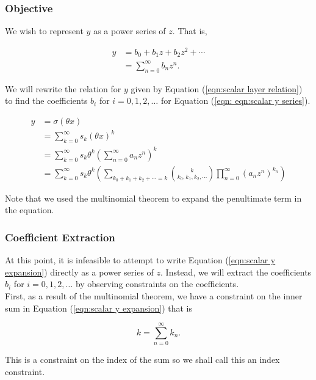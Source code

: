 \subsubsection{Objective}
We wish to represent $y$ as a power series of $z$. That is,

\begin{align}
    y
    &= b_0 + b_1 z + b_2 z^2 + \cdots \nonumber \\
	&= \sum_{n=0}^{\infty} b_{n} z^{n}.
	\label{eqn:scalar y series}
\end{align}

We will rewrite the relation for $y$ given by Equation (\ref{eqn:scalar layer relation}) to find the coefficients $b_i$ for $i = 0, 1, 2, \ldots$ for Equation (\ref{eqn: eqn:scalar y series}).

\begin{align}
    y
    &= \sigma(\theta x) \nonumber \\
    &= \sum_{k=0}^{\infty} s_k (\theta x)^k \nonumber \\
    &= \sum_{k=0}^{\infty} s_k \theta^k \left(\sum_{n=0}^{\infty} a_{n} z^{n}\right)^{k} \nonumber \\
	&= \sum_{k=0}^{\infty} s_k \theta^k \left(\sum_{k_0 + k_1 + k_2 + \cdots = k} \binom{k}{k_0, k_1, k_2, \cdots} \prod_{n=0}^{\infty} (a_n z^{n})^{k_n} \right)
	\label{eqn:scalar y expansion}
\end{align}

Note that we used the multinomial theorem to expand the penultimate term in the equation.

\subsubsection{Coefficient Extraction}

At this point, it is infeasible to attempt to write Equation (\ref{eqn:scalar y expansion}) directly as a power series of $z$. Instead, we will extract the coefficients $b_i$ for $i = 0, 1, 2, \ldots$ by observing constraints on the coefficients.\\

First, as a result of the multinomial theorem, we have a constraint on the inner sum in Equation (\ref{eqn:scalar y expansion}) that is

\begin{equation}
	k = \sum_{n=0}^{\infty} k_n.
	\label{eqn:scalar index constraint}
\end{equation}

This is a constraint on the index of the sum so we shall call this an index constraint.\\

